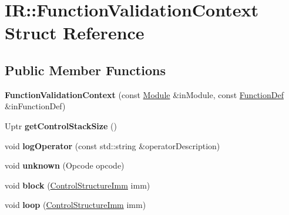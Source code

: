 \hypertarget{struct_i_r_1_1_function_validation_context}{}\section{IR\+:\+:Function\+Validation\+Context Struct Reference}
\label{struct_i_r_1_1_function_validation_context}
\subsection*{Public Member Functions}
\begin{DoxyCompactItemize}
\item 
\mbox{\label{struct_i_r_1_1_function_validation_context_a902aa1ef8421f14a72df3ec7818e57fc}} 
{\bfseries Function\+Validation\+Context} (const \mbox{\hyperlink{struct_i_r_1_1_module}{Module}} \&in\+Module, const \mbox{\hyperlink{struct_i_r_1_1_function_def}{Function\+Def}} \&in\+Function\+Def)
\item 
\mbox{\label{struct_i_r_1_1_function_validation_context_a6710de4db8be4f527ed3815ff21f139c}} 
Uptr {\bfseries get\+Control\+Stack\+Size} ()
\item 
\mbox{\label{struct_i_r_1_1_function_validation_context_a52e339d50f0b217fa9319136d661e6a9}} 
void {\bfseries log\+Operator} (const std\+::string \&operator\+Description)
\item 
\mbox{\label{struct_i_r_1_1_function_validation_context_a09eab85a62fd4caa3787c5933ed5f153}} 
void {\bfseries unknown} (Opcode opcode)
\item 
\mbox{\label{struct_i_r_1_1_function_validation_context_af2b28b37632fb970fe55f6466a0644a0}} 
void {\bfseries block} (\mbox{\hyperlink{struct_i_r_1_1_control_structure_imm}{Control\+Structure\+Imm}} imm)
\item 
\mbox{\label{struct_i_r_1_1_function_validation_context_a88d787bccdccfe32da22ef15101a97ca}} 
void {\bfseries loop} (\mbox{\hyperlink{struct_i_r_1_1_control_structure_imm}{Control\+Structure\+Imm}} imm)

\end{DoxyCompactItemize}
